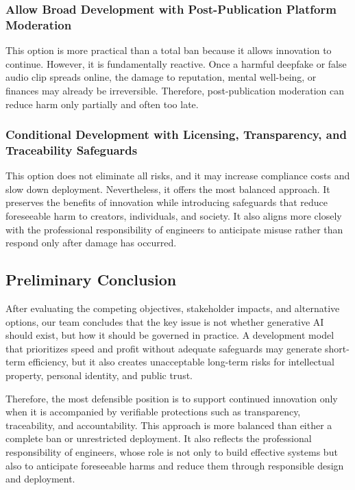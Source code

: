 \subsubsection{Allow Broad Development with Post-Publication Platform Moderation}\label{sec:option-moderation}
This option is more practical than a total ban because it allows innovation to continue. However, it is fundamentally reactive. Once a harmful deepfake or false audio clip spreads online, the damage to reputation, mental well-being, or finances may already be irreversible. Therefore, post-publication moderation can reduce harm only partially and often too late.

\subsubsection{Conditional Development with Licensing, Transparency, and Traceability Safeguards}\label{sec:option-conditional}
This option does not eliminate all risks, and it may increase compliance costs and slow down deployment. Nevertheless, it offers the most balanced approach. It preserves the benefits of innovation while introducing safeguards that reduce foreseeable harm to creators, individuals, and society. It also aligns more closely with the professional responsibility of engineers to anticipate misuse rather than respond only after damage has occurred.

\subsection{Preliminary Conclusion}\label{sec:analysis-conclusion}
After evaluating the competing objectives, stakeholder impacts, and alternative options, our team concludes that the key issue is not whether generative AI should exist, but how it should be governed in practice. A development model that prioritizes speed and profit without adequate safeguards may generate short-term efficiency, but it also creates unacceptable long-term risks for intellectual property, personal identity, and public trust.

Therefore, the most defensible position is to support continued innovation only when it is accompanied by verifiable protections such as transparency, traceability, and accountability. This approach is more balanced than either a complete ban or unrestricted deployment. It also reflects the professional responsibility of engineers, whose role is not only to build effective systems but also to anticipate foreseeable harms and reduce them through responsible design and deployment.
